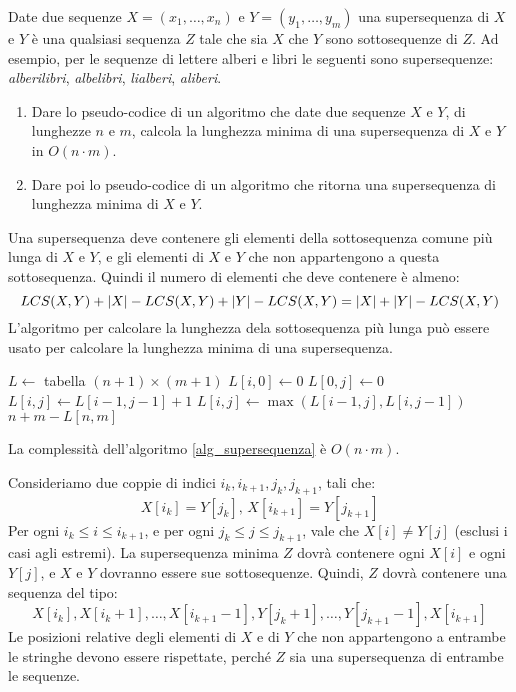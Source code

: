 \begin{esercizio}
Date due sequenze $X = (x_1,\ldots,x_n)$ e $Y = (y_1,\ldots,y_m)$ una supersequenza di $X$ e $Y$ \`e una qualsiasi sequenza $Z$ tale che sia $X$ che $Y$ sono sottosequenze di $Z$. Ad esempio, per le sequenze di lettere alberi e libri le seguenti sono supersequenze: \emph{alberilibri}, \emph{albelibri}, \emph{lialberi}, \emph{aliberi}.
\begin{enumerate}
    \item Dare lo pseudo-codice di un algoritmo che date due sequenze $X$ e $Y$, di lunghezze $n$ e $m$, calcola la lunghezza minima di una supersequenza di $X$ e $Y$ in $O(n \cdot m)$.
    \item Dare poi lo pseudo-codice di un algoritmo che ritorna una supersequenza di lunghezza minima di $X$ e $Y$.
\end{enumerate}
\end{esercizio}

Una supersequenza deve contenere gli elementi della sottosequenza comune pi\`u lunga di $X$ e $Y$, e gli elementi di $X$ e $Y$ che non appartengono a questa sottosequenza. Quindi il numero di elementi che deve contenere \`e almeno:
\[
LCS(X,Y) + \left\lvert{X}\right\rvert - LCS(X,Y) + \left\lvert{Y}\right\rvert - LCS(X,Y) = 
\left\lvert{X}\right\rvert + \left\lvert{Y}\right\rvert - LCS(X,Y)
\]
L'algoritmo per calcolare la lunghezza dela sottosequenza pi\`u lunga pu\`o essere usato per calcolare la lunghezza minima di una supersequenza.

\begin{algorithm}
\begin{algorithmic}
    \State $L \gets$ tabella $(n+1) \times (m+1)$
        \State $L[i,0] \gets 0$
    \EndFor
        \State $L[0,j] \gets 0$
    \EndFor
                \State $L[i,j] \gets L[i-1, j-1] + 1$
            \Else
                \State $L[i,j] \gets \max \left( L[i-1,j], L[i,j-1] \right)$
            \EndIf
        \EndFor
    \EndFor
    \State \Return $n + m - L[n,m]$
\EndFunction
\end{algorithmic}
\caption{\label{alg_supersequenza}trovare la lunghezza minima di una supersequenza}
\end{algorithm}
La complessit\`a dell'algoritmo \ref{alg_supersequenza} \`e $O(n \cdot m)$.

Consideriamo due coppie di indici $i_{k}, i_{k+1}, j_{k}, j_{k+1}$, tali che:
\[
X[i_{k}] = Y[j_{k}], \, X[i_{k+1}] = Y[j_{k+1}]
\]
Per ogni $i_k \le i \le i_{k+1}$, e per ogni $j_k \le j \le j_{k+1}$, vale che $X[i] \neq Y[j]$ (esclusi i casi agli estremi). La supersequenza minima $Z$ dovr\`a contenere ogni $X[i]$ e ogni $Y[j]$, e $X$ e $Y$ dovranno essere sue sottosequenze. Quindi, $Z$ dovr\`a contenere una sequenza del tipo:
\[
X[i_{k}], X[i_{k}+1], \ldots, X[i_{k+1}-1], Y[j_{k}+1], \ldots, Y[j_{k+1}-1], X[i_{k+1}]
\]
Le posizioni relative degli elementi di $X$ e di $Y$ che non appartengono a entrambe le stringhe devono essere rispettate, perch\'e $Z$ sia una supersequenza di entrambe le sequenze.

